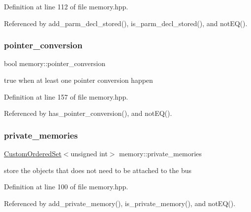 Definition at line 112 of file memory.\+hpp.



Referenced by add\+\_\+parm\+\_\+decl\+\_\+stored(), is\+\_\+parm\+\_\+decl\+\_\+stored(), and not\+E\+Q().

\mbox{\label{classmemory_ac4763c40921f38e1e1e7eda3acb4e0af}} 
\subsubsection{\texorpdfstring{pointer\+\_\+conversion}{pointer\_conversion}}
{\footnotesize\ttfamily bool memory\+::pointer\+\_\+conversion\hspace{0.3cm}{\ttfamily [private]}}



true when at least one pointer conversion happen 



Definition at line 157 of file memory.\+hpp.



Referenced by has\+\_\+pointer\+\_\+conversion(), and not\+E\+Q().

\mbox{\label{classmemory_a51a28f3d0b125a57a16febef16d93326}} 
\subsubsection{\texorpdfstring{private\+\_\+memories}{private\_memories}}
{\footnotesize\ttfamily \hyperlink{classCustomOrderedSet}{Custom\+Ordered\+Set}$<$unsigned int$>$ memory\+::private\+\_\+memories\hspace{0.3cm}{\ttfamily [private]}}



store the objects that does not need to be attached to the bus 



Definition at line 100 of file memory.\+hpp.



Referenced by add\+\_\+private\+\_\+memory(), is\+\_\+private\+\_\+memory(), and not\+E\+Q().

\mbox{\label{classmemory_adec2a898a9a834d8b15d565c418689ed}} 
